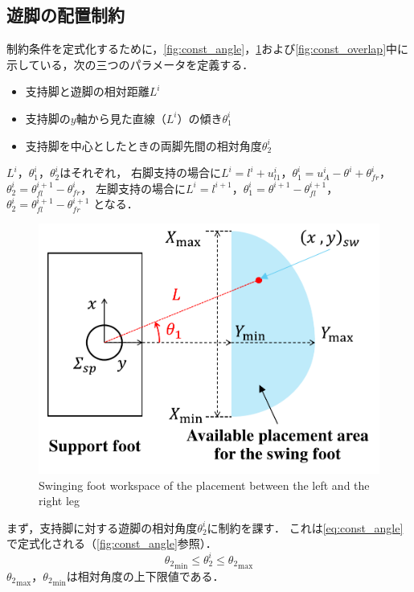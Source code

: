 \documentclass[autodetect-engine,dvipdfmx-if-dvi,ja=standard,a4j,jbase=11pt,magstyle=nomag*]{bxjsreport}
\begin{document}
\subsection{遊脚の配置制約}
制約条件を定式化するために，\cref{fig:const_angle}，\cref{fig:const_place}および\cref{fig:const_overlap}中に示している，次の三つのパラメータを定義する．
\begin{itemize}
    \item 支持脚と遊脚の相対距離$L^i$
    \item 支持脚の$y$軸から見た直線（$L^i$）の傾き$\theta_1^i$
    \item 支持脚を中心としたときの両脚先間の相対角度$\theta_2^i$
\end{itemize}
$L^i$，$\theta_1^i$，$\theta_2^i$はそれぞれ，
右脚支持の場合に$L^i = l^i + u_{l1}^i$，$\theta_1^i = u_A^i - \theta^i + \theta_{fr}^i$，$\theta_2^i = \theta_{fl}^{i + 1} - \theta_{fr}^i$，
左脚支持の場合に$L^i = l^{i + 1}$，$\theta_1^i = \theta^{i + 1} - \theta_{fl}^{i + 1}$，$\theta_2^i = \theta_{fl}^{i + 1} - \theta_{fr}^{i + 1}$
となる．

\begin{figure}[t]
    \centering
    \includegraphics[width=0.9\linewidth, clip]{./figure/const_place.pdf}
    \caption{Swinging foot workspace of the placement between the left and the right leg}
    \label{fig:const_place}
\end{figure}

まず，支持脚に対する遊脚の相対角度$\theta_2^i$に制約を課す．
これは\cref{eq:const_angle}で定式化される（\cref{fig:const_angle}参照）．
\begin{equation}
    \label{eq:const_angle}
    {\theta_2}_{\mathrm{min}} \leq \theta_2^i \leq {\theta_2}_{\mathrm{max}}
\end{equation}
${\theta_2}_{\mathrm{max}}$，${\theta_2}_{\mathrm{min}}$は相対角度の上下限値である．
\end{document}
